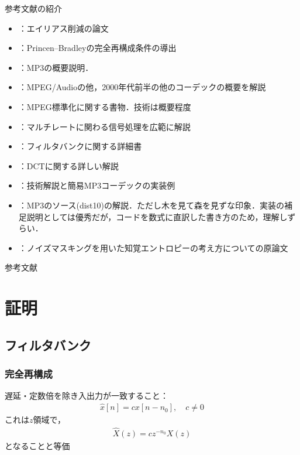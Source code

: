 \documentclass[14pt,xcolor=dvipsnames,table,dvipdfmx]{beamer}
\begin{document}
\begin{frame}{参考文献の紹介}
    \scriptsize
    \begin{itemize}
        \item \cite{edler1992aliasing,liu1997design}：エイリアス削減の論文
        \item \cite{princen1986analysis}：Princen--Bradleyの完全再構成条件の導出
        \item \cite{raissi2002theory}：MP3の概要説明．
        \item \cite{fujiwara2001}：MPEG/Audioの他，2000年代前半の他のコーデックの概要を解説
        \item \cite{yasuda1994}：MPEG標準化に関する書物．技術は概要程度
        \item \cite{kiya1995}：マルチレートに関わる信号処理を広範に解説
        \item \cite{vaidyanathan2002}：フィルタバンクに関する詳細書
        \item \cite{kiya1997}：DCTに関する詳しい解説
        \item \cite{kosugi200108,kosugi200109,kosugi200111,kosugi200201,kosugi200202}：技術解説と簡易MP3コーデックの実装例
        \item \cite{urata1999}：MP3のソース(dist10)の解説．ただし木を見て森を見ずな印象．実装の補足説明としては優秀だが，コードを数式に直訳した書き方のため，理解しずらい．
        \item \cite{johnston1988estimation}：ノイズマスキングを用いた知覚エントロピーの考え方についての原論文
    \end{itemize}
\end{frame}

\begin{frame}[allowframebreaks]{参考文献}
    \printbibliography[heading=none]
\end{frame}

\section{証明}

\subsection{フィルタバンク} \label{sec:proofs_filter_bank}

\begin{frame}[c]
    \frametitle{完全再構成}
    遅延・定数倍を除き入出力が一致すること：
    \begin{align}
        \hat{x}[n] = c x[n - n_{0}], \quad c \neq 0
    \end{align}
    これは$z$領域で，
    \begin{align}
        \hat{X}(z) = c z^{-n_{0}} X(z)
    \end{align}
    となることと等価
\end{frame}
\end{document}

